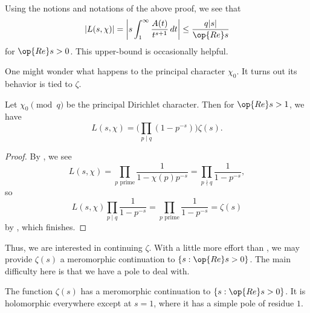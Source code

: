 \documentclass[../notes.tex]{subfiles}
\begin{document}
\begin{remark}
	Using the notions and notations of the above proof, we see that
	\[|L(s,\chi)|=\left|s\int_1^\infty\frac{A(t)}{t^{s+1}}\,dt\right|\le\frac{q|s|}{\op{Re}s}\]
	for $\op{Re}s>0$. This upper-bound is occasionally helpful.
\end{remark}
One might wonder what happens to the principal character $\chi_0$. It turns out its behavior is tied to $\zeta$.
\begin{lemma} \label{lem:l-s-principal}
	Let $\chi_0\pmod q$ be the principal Dirichlet character. Then for $\op{Re}s>1$, we have
	\[L(s,\chi)=\Bigg(\prod_{p\mid q}\left(1-p^{-s}\right)\bigg)\zeta(s).\]
\end{lemma}
\begin{proof}
	By , we see
	\[L(s,\chi)=\prod_{p\text{ prime}}\frac1{1-\chi(p)p^{-s}}=\prod_{p\nmid q}\frac1{1-p^{-s}},\]
	so
	\[L(s,\chi)\prod_{p\mid q}\frac1{1-p^{-s}}=\prod_{p\text{ prime}}\frac1{1-p^{-s}}=\zeta(s)\]
	by , which finishes.
\end{proof}
Thus, we are interested in continuing $\zeta$. With a little more effort than , we may provide $\zeta(s)$ a meromorphic continuation to $\{s:\op{Re}s>0\}$. The main difficulty here is that we have a pole to deal with.
\begin{proposition} \label{prop:continue-zeta}
	The function $\zeta(s)$ has a meromorphic continuation to $\{s:\op{Re}s>0\}$. It is holomorphic everywhere except at $s=1$, where it has a simple pole of residue $1$.
\end{proposition}
\end{document}
